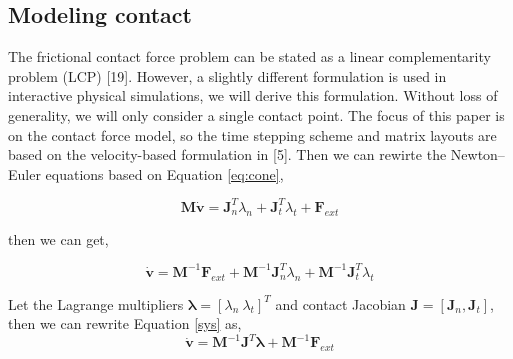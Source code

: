 \subsection{Modeling contact}
    The frictional contact force problem can be stated as a linear complementarity problem (LCP) [19]. However, a slightly different formulation is used in interactive physical simulations, we will derive this formulation. Without loss of generality, we will only consider a single contact point. The focus of this paper is on the contact force model, so the time stepping scheme and matrix layouts are based on the velocity-based formulation in [5]. Then we can rewirte the Newton–Euler equations based on Equation \ref{eq:cone},

    \begin{equation}
        \pmb{M}\dot{\mathbf{v}} = \pmb{J}_{n}^{T}\lambda_n + \pmb{J}_{t}^{T}\lambda_{t} + \mathbf{F}_{ext}
    \end{equation}

    then we can get,

    \begin{equation}
        \dot{\mathbf{v}} = \pmb{M}^{-1}\mathbf{F}_{ext} + \pmb{M}^{-1}\pmb{J}_{n}^{T}\lambda_{n} + \pmb{M}^{-1}\pmb{J}_{t}^{T}\lambda_{t}
        \label{sys}
    \end{equation}

    Let the Lagrange multipliers $\pmb{\lambda} = [\lambda_n~\lambda_t]^{T}$ and contact Jacobian $\pmb{J} = [\pmb{J}_n, \pmb{J}_{t}]$, then we can rewrite Equation \ref{sys} as, 
    \begin{equation}
        \dot{\mathbf{v}} = \pmb{M}^{-1}\pmb{J}^{T}\pmb{\lambda} + \pmb{M}^{-1}\mathbf{F}_{ext}
    \end{equation}

